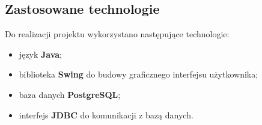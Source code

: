 \subsection{Zastosowane technologie}

Do realizacji projektu wykorzystano następujące technologie:

\begin{itemize}
    \item język \textbf{Java};
    \item biblioteka \textbf{Swing} do budowy graficznego interfejsu użytkownika;
    \item baza danych \textbf{PostgreSQL};
    \item interfejs \textbf{JDBC} do komunikacji z bazą danych.
\end{itemize}
